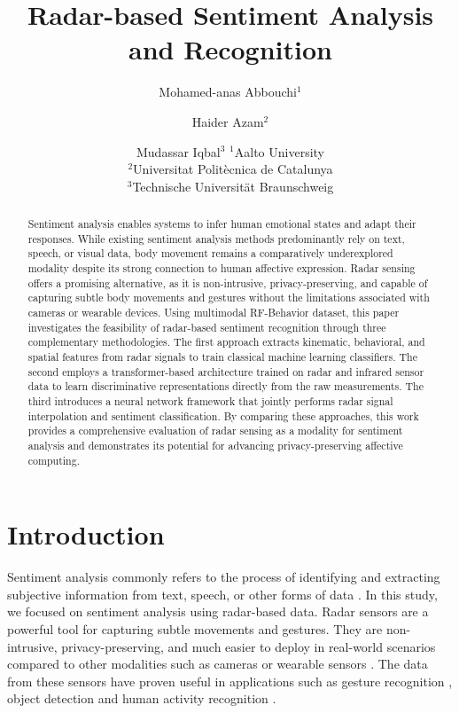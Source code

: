 \documentclass{article}
\title{Radar-based Sentiment Analysis and Recognition}
\author{
Mohamed-anas Abbouchi$^1$
\and
Haider Azam$^2$
\and
Mudassar Iqbal$^3$
\affiliations
$^1$Aalto University\\
$^2$Universitat Politècnica de Catalunya\\
$^3$Technische Universität Braunschweig\\
}
\begin{document}
\maketitle

\begin{abstract}

Sentiment analysis enables systems to infer human emotional states and adapt their responses. While existing sentiment analysis methods predominantly rely on text, speech, or visual data, body movement remains a comparatively underexplored modality despite its strong connection to human affective expression. Radar sensing offers a promising alternative, as it is non-intrusive, privacy-preserving, and capable of capturing subtle body movements and gestures without the limitations associated with cameras or wearable devices. Using multimodal RF-Behavior dataset, this paper investigates the feasibility of radar-based sentiment recognition through three complementary methodologies. The first approach extracts kinematic, behavioral, and spatial features from radar signals to train classical machine learning classifiers. The second employs a transformer-based architecture trained on radar and infrared sensor data to learn discriminative representations directly from the raw measurements. The third introduces a neural network framework that jointly performs radar signal interpolation and sentiment classification. By comparing these approaches, this work provides a comprehensive evaluation of radar sensing as a modality for sentiment analysis and demonstrates its potential for advancing privacy-preserving affective computing.


\end{abstract}

\section{Introduction}

Sentiment analysis commonly refers to the process of identifying and extracting subjective information from text, speech, or other forms of data \cite{ain2017sentiment}. In this study, we focused on sentiment analysis using radar-based data. Radar sensors are a powerful tool for capturing subtle movements and gestures. They are non-intrusive, privacy-preserving, and much easier to deploy in real-world scenarios compared to other modalities such as cameras or wearable sensors \cite{radargesture2020}. The data from these sensors have proven useful in applications such as gesture recognition \cite{radargesture2020}, object detection \cite{radarobject2018} and human activity recognition \cite{radaractivity2019}. 
\end{document}
